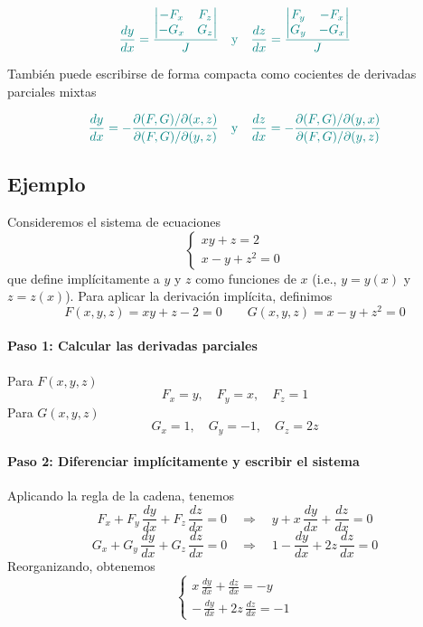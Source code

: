 \documentclass{article}
\begin{document}
\[\color{teal}
\frac{dy}{dx} =
\frac{
\begin{vmatrix}
-F_x & F_z \\
-G_x & G_z
\end{vmatrix}
}{J}
\quad \text{y} \quad
\frac{dz}{dx} =
\frac{
\begin{vmatrix}
F_y & -F_x \\
G_y & -G_x
\end{vmatrix}
}{J}
\]

También puede escribirse de forma compacta como cocientes de derivadas parciales mixtas

\[\color{teal}
\frac{dy}{dx} = -\frac{\partial(F,G)/\partial(x,z)}{\partial(F,G)/\partial(y,z)}
\quad \text{y} \quad 
\frac{dz}{dx} = -\frac{\partial(F,G)/\partial(y,x)}{\partial(F,G)/\partial(y,z)}
\]
\subsection*{Ejemplo}

Consideremos el sistema de ecuaciones
\[
\begin{cases}
xy + z = 2 \\
x - y + z^2 = 0
\end{cases}
\]
que define implícitamente a \( y \) y \( z \) como funciones de \( x \) (i.e., \( y=y(x) \) y \( z=z(x) \)). Para aplicar la derivación implícita, definimos
\[
F(x,y,z) = xy + z - 2 = 0 \qquad G(x,y,z) = x - y + z^2 = 0
\]

\paragraph{\color{teal}Paso 1: Calcular las derivadas parciales}  
Para \( F(x,y,z) \)
\[
F_x = y,\quad F_y = x,\quad F_z = 1
\]
Para \( G(x,y,z) \)
\[
G_x = 1,\quad G_y = -1,\quad G_z = 2z
\]

\paragraph{\color{teal}Paso 2: Diferenciar implícitamente y escribir el sistema}  
Aplicando la regla de la cadena, tenemos
\[
F_x + F_y\,\frac{dy}{dx}+F_z\,\frac{dz}{dx}=0 \quad \Longrightarrow \quad y + x\,\frac{dy}{dx}+ \frac{dz}{dx} = 0
\]
\[
G_x + G_y\,\frac{dy}{dx}+G_z\,\frac{dz}{dx}=0 \quad \Longrightarrow \quad 1 - \frac{dy}{dx}+2z\,\frac{dz}{dx} = 0
\]
Reorganizando, obtenemos
\[
\begin{cases}
x\,\frac{dy}{dx}+ \frac{dz}{dx} = -y \\
-\,\frac{dy}{dx}+2z\,\frac{dz}{dx} = -1
\end{cases}
\]
\end{document}

